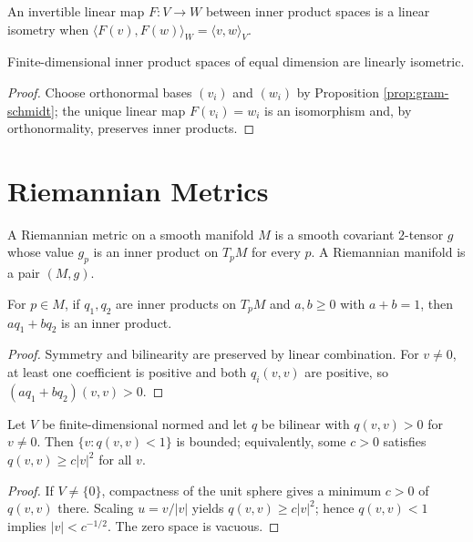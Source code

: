 An invertible linear map $F:V\to W$ between inner product spaces is a linear isometry when $\langle F(v),F(w)\rangle_W=\langle v,w\rangle_V$.

\begin{proposition}
\label{prop:inner-product-spaces-linearly-isometric}
\leanok
{}
Finite-dimensional inner product spaces of equal dimension are linearly isometric.
\end{proposition}
\begin{proof}
\leanok
\sketch Choose orthonormal bases $(v_i)$ and $(w_i)$ by Proposition \ref{prop:gram-schmidt}; the unique linear map $F(v_i)=w_i$ is an isomorphism and, by orthonormality, preserves inner products.
\end{proof}

\section{Riemannian Metrics}

\begin{definition}
\label{def:riemannian-metric}
\leanok
A Riemannian metric on a smooth manifold $M$ is a smooth covariant $2$-tensor $g$ whose value $g_p$ is an inner product on $T_pM$ for every $p$. A Riemannian manifold is a pair $(M,g)$.
\end{definition}

\begin{lemma}
\label{lem:convex-inner-products}
\leanok
For $p\in M$, if $q_1,q_2$ are inner products on $T_pM$ and $a,b\ge0$ with $a+b=1$, then $a q_1+b q_2$ is an inner product.
\end{lemma}
\begin{proof}
\leanok
\sketch Symmetry and bilinearity are preserved by linear combination. For $v\ne0$, at least one coefficient is positive and both $q_i(v,v)$ are positive, so $(a q_1+b q_2)(v,v)>0$.
\end{proof}

\begin{lemma}
\label{lem:posdef-coercive}
\leanok
Let $V$ be finite-dimensional normed and let $q$ be bilinear with $q(v,v)>0$ for $v\ne0$. Then $\{v:q(v,v)<1\}$ is bounded; equivalently, some $c>0$ satisfies $q(v,v)\ge c|v|^2$ for all $v$.
\end{lemma}
\begin{proof}
\leanok
\sketch If $V\ne\{0\}$, compactness of the unit sphere gives a minimum $c>0$ of $q(v,v)$ there. Scaling $u=v/|v|$ yields $q(v,v)\ge c|v|^2$; hence $q(v,v)<1$ implies $|v|<c^{-1/2}$. The zero space is vacuous.
\end{proof}

